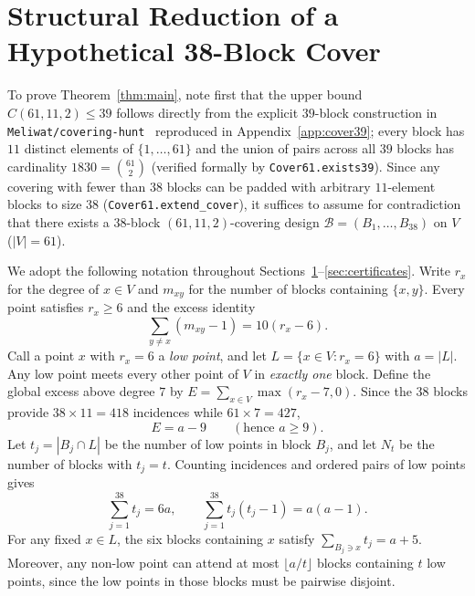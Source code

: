 \documentclass[11pt,a4paper]{article}
\theoremstyle{definition}
\theoremstyle{remark}
\begin{document}
\section{Structural Reduction of a Hypothetical 38-Block Cover}\label{sec:structure}

To prove Theorem~\ref{thm:main}, note first that the upper bound $C(61,11,2) \le 39$ follows directly from the explicit $39$-block construction in \texttt{Meliwat/covering-hunt}~\cite{Meliwat2026} reproduced in Appendix~\ref{app:cover39}; every block has $11$ distinct elements of $\{1,\dots,61\}$ and the union of pairs across all $39$ blocks has cardinality $1830 = \binom{61}{2}$ (verified formally by \texttt{Cover61.exists39}). Since any covering with fewer than $38$ blocks can be padded with arbitrary $11$-element blocks to size $38$ (\texttt{Cover61.extend\_cover}), it suffices to assume for contradiction that there exists a $38$-block $(61,11,2)$-covering design $\mathcal{B} = (B_1,\dots,B_{38})$ on $V$ ($|V| = 61$).

We adopt the following notation throughout Sections~\ref{sec:structure}--\ref{sec:certificates}. Write $r_x$ for the degree of $x \in V$ and $m_{xy}$ for the number of blocks containing $\{x,y\}$. Every point satisfies $r_x \ge 6$ and the excess identity
\begin{equation}\label{eq:repeat}
  \sum_{y \ne x} (m_{xy} - 1) = 10(r_x - 6).
\end{equation}
Call a point $x$ with $r_x = 6$ a \emph{low point}, and let $L = \{x \in V : r_x = 6\}$ with $a = |L|$. Any low point meets every other point of $V$ in \emph{exactly one} block. Define the global excess above degree $7$ by $E = \sum_{x \in V} \max(r_x - 7, 0)$. Since the $38$ blocks provide $38 \times 11 = 418$ incidences while $61 \times 7 = 427$,
\begin{equation}\label{eq:E}
  E = a - 9 \qquad (\text{hence } a \ge 9).
\end{equation}
Let $t_j = |B_j \cap L|$ be the number of low points in block $B_j$, and let $N_t$ be the number of blocks with $t_j = t$. Counting incidences and ordered pairs of low points gives
\begin{equation}\label{eq:moments}
  \sum_{j=1}^{38} t_j = 6a, \qquad \sum_{j=1}^{38} t_j(t_j - 1) = a(a - 1).
\end{equation}
For any fixed $x \in L$, the six blocks containing $x$ satisfy $\sum_{B_j \ni x} t_j = a + 5$. Moreover, any non-low point can attend at most $\lfloor a/t \rfloor$ blocks containing $t$ low points, since the low points in those blocks must be pairwise disjoint.
\end{document}
